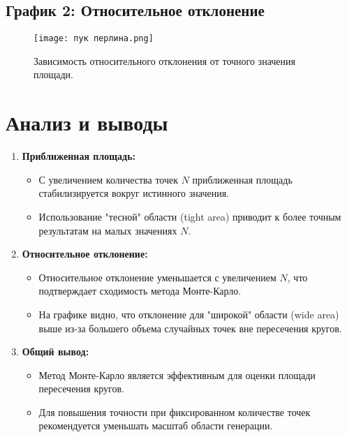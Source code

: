\documentclass{article}
\begin{document}
\subsection{График 2: Относительное отклонение}
\begin{figure}[h!]
    \centering
    \texttt{[image: пук перлина.png]}
    \caption{Зависимость относительного отклонения от точного значения площади.}
\end{figure}

\section{Анализ и выводы}
\begin{enumerate}
    \item \textbf{Приближенная площадь:}
    \begin{itemize}
        \item С увеличением количества точек \(N\) приближенная площадь стабилизируется вокруг истинного значения.
        \item Использование "тесной" области (tight area) приводит к более точным результатам на малых значениях \(N\).
    \end{itemize}
    \item \textbf{Относительное отклонение:}
    \begin{itemize}
        \item Относительное отклонение уменьшается с увеличением \(N\), что подтверждает сходимость метода Монте-Карло.
        \item На графике видно, что отклонение для "широкой" области (wide area) выше из-за большего объема случайных точек вне пересечения кругов.
    \end{itemize}
    \item \textbf{Общий вывод:}
    \begin{itemize}
        \item Метод Монте-Карло является эффективным для оценки площади пересечения кругов.
        \item Для повышения точности при фиксированном количестве точек рекомендуется уменьшать масштаб области генерации.
    \end{itemize}
\end{enumerate}
\end{document}
